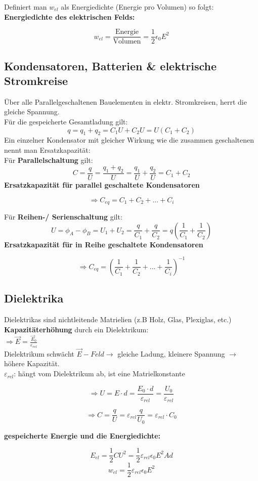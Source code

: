 Definiert man $w_{el}$ als Energiedichte (Energie pro Volumen) so folgt: \\[1ex]
\textbf{Energiedichte des elektrischen Felds:}
\begin{formulabox}
    \[
        w_{el} = \frac{\text{Energie}}{\text{Volumen}} = \frac{1}{2}\epsilon_0 E^2
    \]
\end{formulabox}

\subsection{Kondensatoren, Batterien \& elektrische Stromkreise}
Über alle Parallelgeschaltenen Bauelementen in elektr. Stromkreisen, herrt die gleiche Spannung. \\[1ex]
Für die gespeicherte Gesamtladung gilt:
\[
    q = q_1 + q_2 = C_1 U + C_2 U = U(C_1 + C_2)
\]
Ein einzelner Kondensator mit gleicher Wirkung wie die zusammen geschaltenen nennt man Ersatzkapazität:\\[3ex]
Für \textbf{Parallelschaltung} gilt:
\[
    C = \frac{q}{U} = \frac{q_1 + q_2}{U} = \frac{q_1}{U} + \frac{q_2}{U} = C_1 + C_2
\]
\textbf{Ersatzkapazität für parallel geschaltete Kondensatoren}
\begin{formulabox}
    \[
        \Rightarrow C_{eq} = C_1 + C_2 + ... + C_i
    \]
\end{formulabox}

Für \textbf{Reihen-/ Serienschaltung} gilt:
\[
    U = \phi_A - \phi_B = U_1 + U_2 = \frac{q}{C_1} + \frac{q}{C_2} = q\left( \frac{1}{C_1} + \frac{1}{C_2} \right)
\]
\textbf{Ersatzkapazität für in Reihe geschaltete Kondensatoren}
\begin{formulabox}
    \[
        \Rightarrow C_{eq} = \left( \frac{1}{C_1} + \frac{1}{C_2} + ... + \frac{1}{C_i} \right)^{-1}
    \]
\end{formulabox}

\subsection{Dielektrika}
Dielektrikas sind nichtleitende Matrielien (z.B Holz, Glas, Plexiglas, etc.) \\[2ex]

\textbf{Kapazitäterhöhung} durch ein Dielektrikum: \\[1ex]
$\Rightarrow \Vec{E} = \frac{\Vec{E}_0}{\varepsilon_{rel}}$ \\[1ex]
Dielektrikum schwächt $\Vec{E}-Feld \rightarrow$ gleiche Ladung, kleinere Spannung $\rightarrow$ höhere Kapazität. \\[1ex]
$\varepsilon_{rel}$: hängt vom Dielektrikum ab, ist eine Matrielkonstante \\[2ex]
\begin{formulabox}
    \[
        \Rightarrow U = E \cdot d = \frac{E_0 \cdot d}{\varepsilon_{rel}} = \frac{U_0}{\varepsilon_{rel}}
    \]  
\end{formulabox}
\begin{formulabox}
    \[
        \Rightarrow C = \frac{q}{U} = \varepsilon_{rel}\frac{q}{U_0} = \varepsilon_{rel} \cdot C_0
    \]
\end{formulabox}

\textbf{gespeicherte Energie und die Energiedichte:}
\begin{formulabox}
    \[
        E_{el} = \frac{1}{2}CU^2 = \frac{1}{2}\varepsilon_{rel}\epsilon_0 E^2 A d
    \]
    \[
    w_{el} = \frac{1}{2}\varepsilon_{rel}\epsilon_0 E^2
    \]
\end{formulabox}
